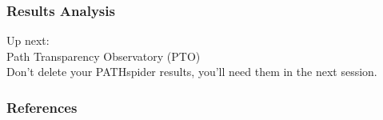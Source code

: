 \documentclass[handout,notes]{beamer}
\begin{document}
\begin{frame}
\frametitle{Results Analysis}
\begin{center}
{\LARGE Up next: \\
Path Transparency Observatory (PTO)} \\
Don't delete your PATHspider results, you'll need them in the next session.
\end{center}
\end{frame}

\begin{frame}[allowframebreaks]
\frametitle{References}


\end{frame}
\end{document}
